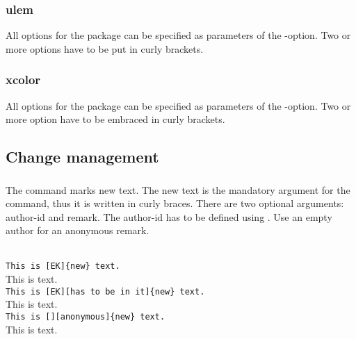 \subsubsection{ulem}

All options for the  package can be specified as parameters of the -option.
Two or more options have to be put in curly brackets.




\subsubsection{xcolor}

All options for the  package can be specified as parameters of the -option.
Two or more option have to be embraced in curly brackets.




\subsection{Change management}
\label{sec:user:changemanagement}

\subsubsection{}
\DescribeMacro{\added}

The command  marks new text.
The new text is the mandatory argument for the command, thus it is written in curly braces.
There are two optional arguments: author-id and remark.
The author-id has to be defined using .
Use an empty author for an anonymous remark.

\begin{chusage}
		\>\\
	\usageexample
		\>\texttt{This is [EK]\{new\} text.}\\
		\>This is  text.\\
		\>\texttt{This is [EK][has to be in it]\{new\} text.}\\
		\>This is  text.\\
		\>\texttt{This is [][anonymous]\{new\} text.}\\
		\>This is  text.
\end{chusage}


